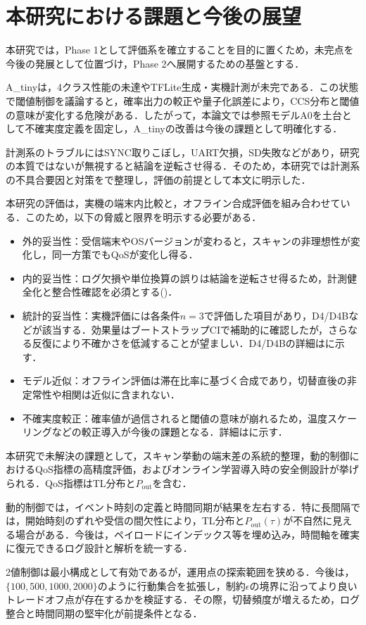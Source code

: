 \section{本研究における課題と今後の展望}
本研究では，Phase 1として評価系を確立することを目的に置くため，未完点を今後の発展として位置づけ，Phase 2へ展開するための基盤とする．

A\_tinyは，4クラス性能の未達やTFLite生成・実機計測が未完である．この状態で閾値制御を議論すると，確率出力の較正や量子化誤差により，CCS分布と閾値の意味が変化する危険がある．したがって，本論文では参照モデルA0を土台として不確実度定義を固定し，A\_tinyの改善は今後の課題として明確化する．

計測系のトラブルにはSYNC取りこぼし，UART欠損，SD失敗などがあり，研究の本質ではないが無視すると結論を逆転させ得る．そのため，本研究では計測系の不具合要因と対策をで整理し，評価の前提として本文に明示した．

本研究の評価は，実機の端末内比較と，オフライン合成評価を組み合わせている．このため，以下の脅威と限界を明示する必要がある．
\begin{itemize}
  \item 外的妥当性：受信端末やOSバージョンが変わると，スキャンの非理想性が変化し，同一方策でもQoSが変化し得る．
  \item 内的妥当性：ログ欠損や単位換算の誤りは結論を逆転させ得るため，計測健全化と整合性確認を必須とする()．
  \item 統計的妥当性：実機評価には各条件$n=3$で評価した項目があり，D4/D4Bなどが該当する．効果量はブートストラップCIで補助的に確認したが，さらなる反復により不確かさを低減することが望ましい．D4/D4Bの詳細はに示す．
  \item モデル近似：オフライン評価は滞在比率に基づく合成であり，切替直後の非定常性や相関は近似に含まれない．
  \item 不確実度較正：確率値が過信されると閾値の意味が崩れるため，温度スケーリングなどの較正導入が今後の課題となる．詳細はに示す．
\end{itemize}

本研究で未解決の課題として，スキャン挙動の端末差の系統的整理，動的制御におけるQoS指標の高精度評価，およびオンライン学習導入時の安全側設計が挙げられる．QoS指標はTL分布と$P_{\mathrm{out}}$を含む．

動的制御では，イベント時刻の定義と時間同期が結果を左右する．特に長間隔では，開始時刻のずれや受信の間欠性により，TL分布と$P_{\mathrm{out}}(\tau)$が不自然に見える場合がある．今後は，ペイロードにインデックス等を埋め込み，時間軸を確実に復元できるログ設計と解析を統一する．

2値制御は最小構成として有効であるが，運用点の探索範囲を狭める．今後は，$\{100,500,1000,2000\}$のように行動集合を拡張し，制約$\epsilon$の境界に沿ってより良いトレードオフ点が存在するかを検証する．その際，切替頻度が増えるため，ログ整合と時間同期の堅牢化が前提条件となる．





